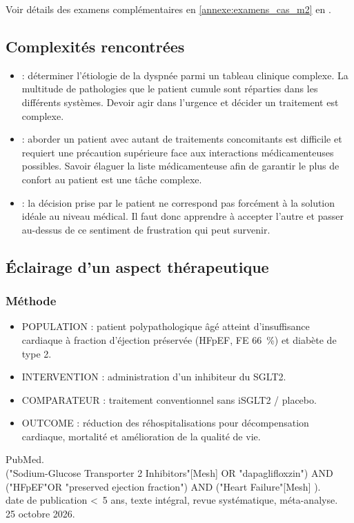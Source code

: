 Voir détails des examens complémentaires en \cref{annexe:examens_cas_m2} en .

\subsection{Complexités rencontrées}
\begin{itemize}[label=\textbullet]
    \item {} : déterminer l’étiologie de la dyspnée parmi un tableau clinique complexe. La multitude de pathologies que le patient cumule sont réparties dans les différents systèmes. Devoir agir dans l’urgence et décider un traitement est complexe.
    \item {} : aborder un patient avec autant de traitements concomitants est difficile et requiert une précaution supérieure face aux interactions médicamenteuses possibles. Savoir élaguer la liste médicamenteuse afin de garantir le plus de confort au patient est une tâche complexe.
    \item {} : la décision prise par le patient ne correspond pas forcément à la solution idéale au niveau médical. Il faut donc apprendre à accepter l’autre et passer au-dessus de ce sentiment de frustration qui peut survenir.
    \end{itemize}
\subsection{Éclairage d’un aspect thérapeutique}
\subsubsection{Méthode}
\begin{itemize}[compact, label=\textbullet]
    \item POPULATION : patient polypathologique âgé atteint d'insuffisance cardiaque à fraction d'éjection préservée (HFpEF, FE \qty{66}{\percent}) et diabète de type 2.
    \item INTERVENTION : administration d'un inhibiteur du SGLT2.
    \item COMPARATEUR : traitement conventionnel sans iSGLT2 / placebo.
    \item OUTCOME : réduction des réhospitalisations pour décompensation cardiaque, mortalité et amélioration de la qualité de vie.
    \end{itemize}
 PubMed.\\
 ("Sodium-Glucose Transporter 2 Inhibitors"[Mesh] OR "dapaglifloxzin") AND ("HFpEF"OR "preserved ejection fraction") AND ("Heart Failure"[Mesh] ).\\
 date de publication <~5 ans, texte intégral, revue systématique, méta-analyse.\\
 25 octobre 2026.


